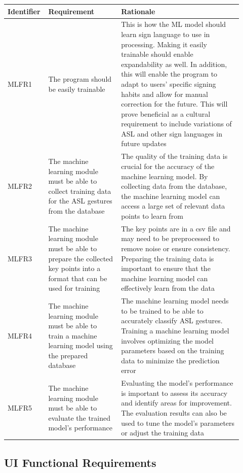 \documentclass[12pt]{article}
\begin{document}
\renewcommand{\arraystretch}{1.2}
\noindent \begin{tabularx}{\textwidth}{p{0.12\linewidth}|p{0.3\linewidth}|p{0.5\linewidth}}
\toprule
\textbf{Identifier} & \textbf{Requirement} & \textbf{Rationale}\\
\midrule
MLFR1 
& The program should be easily trainable
& This is how the ML model should learn sign language to use in processing. Making it easily trainable should enable expandability as well. In addition, this will enable the program to adapt to users’ specific signing habits and allow for manual correction for the future. This will prove beneficial as a cultural requirement to include variations of ASL and other sign languages in future updates\\
\hline
MLFR2 
& The machine learning module must be able to collect training data for the ASL gestures from the database
& The quality of the training data is crucial for the accuracy of the machine learning model. By collecting data from the database, the machine learning model can access a large set of relevant data points to learn from\\
\hline
MLFR3 
& The machine learning module must be able to prepare the collected key points into a format that can be used for training
& The key points are in a csv file and may need to be preprocessed to remove noise or ensure consistency. Preparing the training data is important to ensure that the machine learning model can effectively learn from the data\\
\hline
MLFR4 
& The machine learning module must be able to train a machine learning model using the prepared database
& The machine learning model needs to be trained to be able to accurately classify ASL gestures. Training a machine learning model involves optimizing the model parameters based on the training data to minimize the prediction error\\
\hline
MLFR5 
& The machine learning module must be able to evaluate the trained model's performance
& Evaluating the model's performance is important to assess its accuracy and identify areas for improvement. The evaluation results can also be used to tune the model's parameters or adjust the training data\\
\bottomrule
\end{tabularx}

\subsection{UI Functional Requirements}
\end{document}
